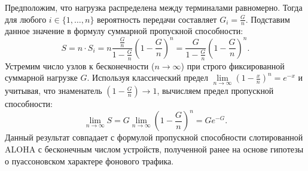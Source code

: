 \begin{conseq}
Предположим, что нагрузка распределена между терминалами равномерно. Тогда для любого $i \in \{1, \dots, n\}$ вероятность передачи составляет $G_i = \frac{G}{n}$. Подставим данное значение в формулу суммарной пропускной способности:
$$
S = n \cdot S_i = n \frac{\frac{G}{n}}{1 - \frac{G}{n}} \left(1 - \frac{G}{n}\right)^n = \frac{G}{1 - \frac{G}{n}} \left(1 - \frac{G}{n}\right)^n.
$$
Устремим число узлов к бесконечности ($n \to \infty$) при строго фиксированной суммарной нагрузке $G$. Используя классический предел $\lim\limits_{n \to \infty} \left(1 - \frac{x}{n}\right)^n = e^{-x}$ и учитывая, что знаменатель $\left(1 - \frac{G}{n}\right) \to 1$, вычисляем предел пропускной способности:
$$
\lim_{n \to \infty} S = G \lim_{n \to \infty} \left(1 - \frac{G}{n}\right)^n = G e^{-G}.
$$
Данный результат совпадает с формулой пропускной способности слотированной ALOHA с бесконечным числом устройств, полученной ранее на основе гипотезы о пуассоновском характере фонового трафика.
\end{conseq}
